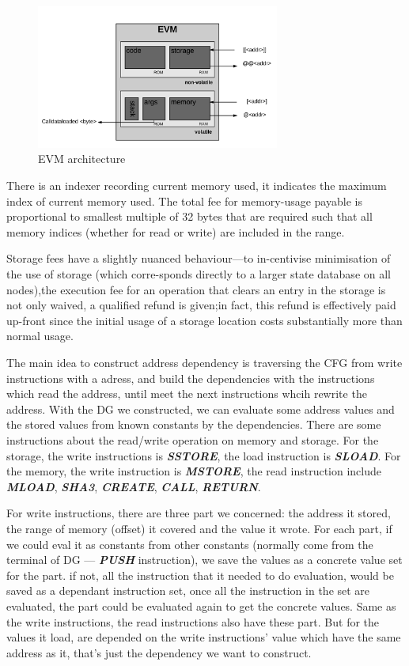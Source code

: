 \documentclass{article}
\begin{document}
\begin{figure}[ht!]
\centering
\includegraphics[width=80mm]{EVM.png}
\caption{EVM architecture\label{overflow}}
\end{figure}

There is an indexer recording current memory used, it indicates the maximum index of current memory used. The total fee for memory-usage payable is proportional to smallest multiple of 32 bytes  that  are  required  such  that  all  memory  indices (whether for read or write) are included in the range\cite{wood2014ethereum}.

Storage fees have a slightly nuanced behaviour—to in-centivise minimisation of the use of storage (which corre-sponds directly to a larger state database on all nodes),the execution fee for an operation that clears an entry in the storage is not only waived, a qualified refund is given;in fact, this refund is effectively paid up-front since the initial usage of a storage location costs substantially more than normal usage\cite{wood2014ethereum}.

The main idea to construct address dependency is traversing the CFG from write instructions with a adress, and build the dependencies with the instructions which read the address, until meet the next instructions whcih rewrite the address. With the DG we constructed, we can evaluate some address values and the stored values from known constants by the dependencies. There are some instructions about the read/write operation on memory and storage. For the storage, the write instructions is \textbf{\textit{SSTORE}}, the load instruction is \textbf{\textit{SLOAD}}. For the memory, the write instruction is \textbf{\textit{MSTORE}}, the read instruction include \textbf{\textit{MLOAD}}, \textbf{\textit{SHA3}}, \textbf{\textit{CREATE}}, \textbf{\textit{CALL}}, \textbf{\textit{RETURN}}.

For write instructions, there are three part we concerned: the address it stored, the range of memory (offset) it covered and the value it wrote. For each part, if we could eval it as constants from other constants (normally come from the terminal of DG --- \textbf{\textit{PUSH}} instruction), we save the values as a concrete value set for the part. if not, all the instruction that it needed to do evaluation, would be saved as a dependant instruction set, once all the instruction in the set are evaluated, the part could be evaluated again to get the concrete values. Same as the write instructions, the read instructions also have these part. But for the values it load, are depended on the write instructions' value which have the same address as it, that's just the dependency we want to construct.
\end{document}
